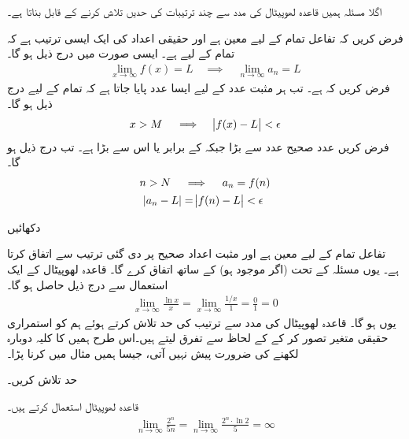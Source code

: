 اگلا مسئلہ ہمیں قاعدہ لھوپیٹال کی مدد سے چند ترتیبات کی حدیں تلاش کرنے کے قابل بناتا ہے۔

فرض کریں کہ تفاعل  تمام  کے لیے معین ہے اور  حقیقی اعداد کی ایک ایسی ترتیب ہے کہ تمام  کے لیے  ہے۔ ایسی صورت میں درج ذیل ہو گا۔
\begin{align*}
\lim_{x\to\infty}f(x)=L\quad \implies\quad \lim_{n\to \infty}a_n=L
\end{align*}  
فرض کریں کہ  ہے۔ تب ہر مثبت عدد  کے لیے ایسا عدد  پایا جاتا ہے کہ تمام  کے لیے درج ذیل ہو گا۔
\begin{align*}
x>M\quad\implies \quad \abs{f(x)-L}<\epsilon
\end{align*}
فرض کریں عدد صحیح  عدد  سے بڑا جبکہ  کے برابر یا اس سے بڑا ہے۔ تب درج ذیل ہو گا۔
\begin{align*}
n>N\quad &\implies \quad a_n=f(n)\\
\abs{a_n-L}&=\abs{f(n)-L}<\epsilon
\end{align*}

دکھائیں 

تفاعل  تمام  کے لیے معین ہے اور مثبت اعداد صحیح پر  دی گئی  ترتیب سے اتفاق کرتا ہے۔ یوں  مسئلہ  کے تحت  (اگر موجود ہو) کے ساتھ اتفاق کرے گا۔ قاعدہ لھوپیٹال کے ایک استعمال سے درج ذیل حاصل ہو گا۔
\begin{align*}
\lim_{x\to \infty}\frac{\ln x}{x}=\lim_{x\to\infty}\frac{1/x}{1}=\frac{0}{1}=0
\end{align*}  
یوں  ہو گا۔
قاعدہ لھوپیٹال کی مدد سے ترتیب کی حد تلاش کرتے ہوئے ہم  کو استمراری حقیقی متغیر تصور کر کے  کے لحاظ سے تفرق لیتے  ہیں۔اس طرح ہمیں  کا کلیہ دوبارہ لکھنے کی ضرورت پیش نہیں آتی، جیسا ہمیں مثال  میں کرنا پڑا۔

حد  تلاش کریں۔

قاعدہ لھوپیٹال استعمال کرتے ہیں۔
\begin{align*}
\lim_{n\to\infty}\frac{2^n}{5n}=\lim_{n\to \infty}\frac{2^n\cdot \ln 2}{5}=\infty
\end{align*}

